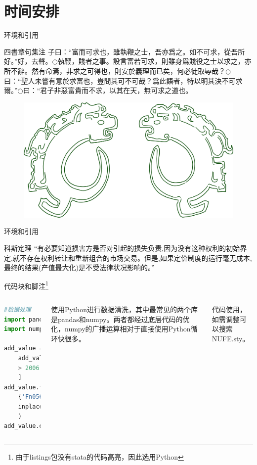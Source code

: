 \documentclass[xcolor=table,mathserif]{beamer}
\begin{document}
\section{时间安排}

\begin{frame}{环境和引用}
    \begin{Quotation}{四書章句集注}
        \normalsize
        子曰：“富而可求也，雖執鞭之士，吾亦爲之。如不可求，從吾所好。”{\fangsong\small 好，去聲。$\bigcirc $執鞭，賤者之事。設言富若可求，則雖身爲賤役之士以求之，亦所不辭。然有命焉，非求之可得也，則安於義理而已矣，何必徒取辱哉？$\bigcirc $曰：“聖人未嘗有意於求富也，豈問其可不可哉？爲此語者，特以明其決不可求爾。”$\bigcirc $曰：“君子非惡富貴而不求，以其在天，無可求之道也。}
    \end{Quotation}
    \begin{figure}[htp]
        \centering
        \includegraphics[scale=0.03]{./Pictures/kuilong.png}
    \end{figure}
\end{frame}

\begin{frame}{环境和引用}
    \begin{block}{科斯定理}
        “有必要知道损害方是否对引起的损失负责,因为没有这种权利的初始界定,就不存在权利转让和重新组合的市场交易。但是,如果定价制度的运行毫无成本,最终的结果(产值最大化)是不受法律状况影响的。”\cite{Article1960}
    \end{block}
\end{frame}

\begin{frame}[fragile]{代码块和脚注\footnote{由于listings包没有stata的代码高亮，因此选用Python}}
    \begin{columns}
    \begin{lstlisting}[language=Python]
#数据处理
import pandas as pd 
import numpy as np

add_value = add_value[
    add_value['Accper'].dt.year 
    > 2006
    ]
add_value.fillna(
    {'Fn05602':0},
    inplace=True
    )
add_value.dropna()
    \end{lstlisting}
    使用Python进行数据清洗，其中最常见的两个库是pandas和numpy。两者都经过底层代码的优化，numpy的广播运算相对于直接使用Python循环快很多。
    
    代码使用，如需调整可以搜索NUFE.sty。
    \end{columns}
\end{frame}
\end{document}

